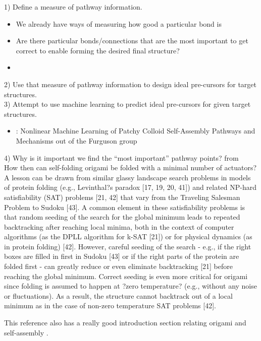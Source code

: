 1) Define a measure of pathway information. \\
\begin{itemize}
\item We already have ways of measuring how good a particular bond is
\item Are there particular bonds/connections that are the most important to get correct to enable forming the desired final structure?
\item  
\end{itemize}



2) Use that measure of pathway information to design ideal pre-cursors for target structures. \\



3) Attempt to use machine learning to predict ideal pre-cursors for given target structures. \\
\begin{itemize}
\item \cite{Long_2014_JPhysChemB}: Nonlinear Machine Learning of Patchy Colloid Self-Assembly Pathways and Mechanisms out of the Furguson group
\end{itemize}


4) Why is it important we find the ``most important'' pathway points? from \cite{Stern_2017_arxiv} \\
How then can self-folding origami be folded with a
minimal number of actuators? A lesson can be drawn
from similar glassy landscape search problems in models
of protein folding (e.g., Levinthal?s paradox [17, 19, 20,
41]) and related NP-hard satisfiability (SAT) problems
[21, 42] that vary from the Traveling Salesman Problem
to Sudoku [43]. A common element in these satisfiability
problems is that random seeding of the search for
the global minimum leads to repeated backtracking after
reaching local minima, both in the context of computer
algorithms (as the DPLL algorithm for k-SAT [21]) or for
physical dynamics (as in protein folding) [42]. However,
careful seeding of the search - e.g., if the right boxes are
filled in first in Sudoku [43] or if the right parts of the protein
are folded first - can greatly reduce or even eliminate
backtracking [21] before reaching the global minimum.
Correct seeding is even more critical for origami since
folding is assumed to happen at ?zero temperature? (e.g.,
without any noise or fluctuations). As a result, the structure
cannot backtrack out of a local minimum as in the
case of non-zero temperature SAT problems [42].

This reference also has a really good introduction section relating origami and self-assembly \cite{Stern_2017_arxiv}.
